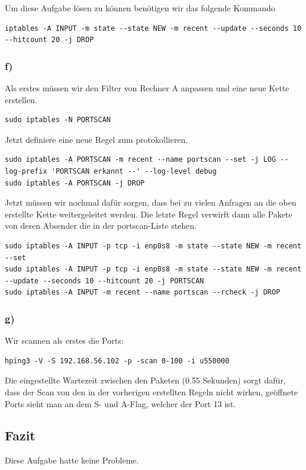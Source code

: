 Um diese Aufgabe lösen zu können benötigen wir das folgende Kommando
\begin{lstlisting}
iptables -A INPUT -m state --state NEW -m recent --update --seconds 10 --hitcount 20 -j DROP
\end{lstlisting}

\subsubsection{f)}
Als erstes müssen wir den Filter von Rechner A anpassen und eine neue Kette erstellen. 
\begin{lstlisting}
sudo iptables -N PORTSCAN
\end{lstlisting}
Jetzt definiere eine neue Regel zum protokollieren.
\begin{lstlisting}
sudo iptables -A PORTSCAN -m recent --name portscan --set -j LOG --log-prefix 'PORTSCAN erkannt --' --log-level debug
sudo iptables -A PORTSCAN -j DROP
\end{lstlisting}
Jetzt müssen wir nochmal dafür sorgen, dass bei zu vielen Anfragen an die oben erstellte Kette weitergeleitet werden. Die letzte Regel verwirft dann alle Pakete von deren Absender die in der portscan-Liste stehen.
\begin{lstlisting}
sudo iptables -A INPUT -p tcp -i enp0s8 -m state --state NEW -m recent --set
sudo iptables -A INPUT -p tcp -i enp0s8 -m state --state NEW -m recent --update --seconds 10 --hitcount 20 -j PORTSCAN
sudo iptables -A INPUT -m recent --name portscan --rcheck -j DROP
\end{lstlisting}

\subsubsection{g)}
Wir scannen als erstes die Ports:
\begin{lstlisting}
hping3 -V -S 192.168.56.102 -p -scan 0-100 -i u550000
\end{lstlisting}
Die eingestellte Wartezeit zwischen den Paketen (0.55 Sekunden) sorgt dafür, dass der Scan von den in der vorherigen erstellten Regeln nicht wirken, geöffnete Ports sieht man an dem S- und A-Flag, welcher der Port 13 ist.

\subsection{Fazit}
Diese Aufgabe hatte keine Probleme.
